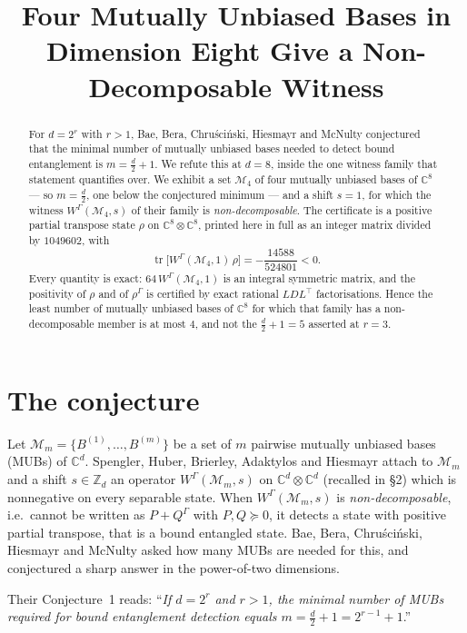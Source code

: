 \documentclass[11pt]{amsart}
\title[A non-decomposable four-MUB witness in dimension eight]
{Four Mutually Unbiased Bases in Dimension Eight Give a Non-Decomposable
Witness}
\date{}
\DeclareMathOperator{\Tr}{tr}
\newcommand{\CC}{\mathbb C}
\newcommand{\W}{W^{\Gamma}}
\newcommand{\M}{\mathcal M}
\begin{document}
\begin{abstract}
For $d=2^r$ with $r>1$, Bae, Bera, Chru\'sci\'nski, Hiesmayr and McNulty conjectured
that the minimal number of mutually unbiased bases needed to detect bound entanglement
is $m=\tfrac d2+1$. We refute this at $d=8$, inside the one witness family that
statement quantifies over. We exhibit a set $\M_4$ of four mutually
unbiased bases of $\CC^8$ --- so $m=\tfrac d2$, one below the conjectured minimum ---
and a shift $s=1$, for which the witness $\W(\M_4,s)$ of their family is
\emph{non-decomposable}. The certificate is a positive partial transpose state $\rho$
on $\CC^8\otimes\CC^8$, printed here in full as an integer matrix divided by
$1049602$, with
\[
  \Tr\bigl[\W(\M_4,1)\,\rho\bigr]=-\frac{14588}{524801}<0 .
\]
Every quantity is exact: $64\,\W(\M_4,1)$ is an integral symmetric matrix, and the
positivity of $\rho$ and of $\rho^{\Gamma}$ is certified by exact rational
$LDL^{\!\top}$ factorisations. Hence the least number of mutually unbiased bases of
$\CC^8$ for which that family has a non-decomposable member is at most $4$, and not
the $\tfrac d2+1=5$ asserted at $r=3$.
\end{abstract}

\maketitle

\section{The conjecture}

Let $\M_m=\{B^{(1)},\dots,B^{(m)}\}$ be a set of $m$ pairwise mutually unbiased bases
(MUBs) of $\CC^d$. Spengler, Huber, Brierley, Adaktylos and Hiesmayr
\cite{Spengler} attach to $\M_m$ and a shift $s\in\mathbb Z_d$ an operator
$\W(\M_m,s)$ on $\CC^d\otimes\CC^d$ (recalled in \S2) which is nonnegative on every
separable state. When $\W(\M_m,s)$ is \emph{non-decomposable}, i.e.\ cannot be written
as $P+Q^{\Gamma}$ with $P,Q\succeq0$, it detects a state with positive partial
transpose, that is a bound entangled state. Bae, Bera, Chru\'sci\'nski, Hiesmayr and
McNulty \cite{BBCHM} asked how many MUBs are needed for this, and conjectured a
sharp answer in the power-of-two dimensions.

Their Conjecture~1 reads: ``\emph{If $d=2^r$ and $r>1$, the minimal number of MUBs
required for bound entanglement detection equals $m=\frac d2+1=2^{r-1}+1$}.''
\end{document}
